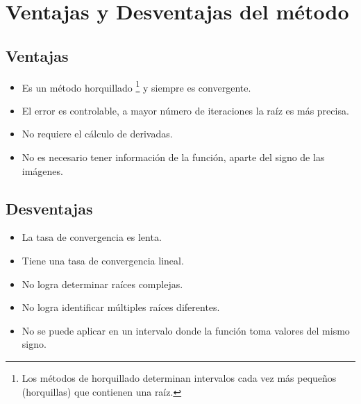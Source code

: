\section{Ventajas y Desventajas del método}

\subsection{Ventajas}

\begin{itemize}
    \item Es un método horquillado \footnote{Los métodos de horquillado determinan intervalos cada vez más pequeños (horquillas) que contienen una raíz.} y siempre es convergente.
    \item El error es controlable, a mayor número de iteraciones la raíz es más precisa.
    \item No requiere el cálculo de derivadas.
    \item No es necesario tener información de la función, aparte del signo de las imágenes.

\end{itemize}

\subsection{Desventajas}

\begin{itemize}
    \item La tasa de convergencia es lenta.
    \item Tiene una tasa de convergencia lineal.
    \item No logra determinar raíces complejas.
    \item No logra identificar múltiples raíces diferentes.
    \item No se puede aplicar en un intervalo donde la función toma valores del mismo signo.

\end{itemize}